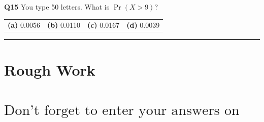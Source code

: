 \documentclass[12pt]{article}
\begin{document}
{\bf Q15} You type 50 letters. What is $\Pr(X > 9)$? \\[0.2cm]
\begin{tabular}{cccc}
{\bf(a)} 0.0056 & {\bf(b)} 0.0110  & {\bf(c)} 0.0167 & {\bf(d)} 0.0039 \\[0.6cm]
\end{tabular}

\rule{\linewidth}{1pt}








\newpage

\section*{Rough Work\\[23cm]}
\section*{\hspace{2cm}$\boxed{\text{Don't forget to enter your answers on the last page!}}$}

\newpage
\end{document}
